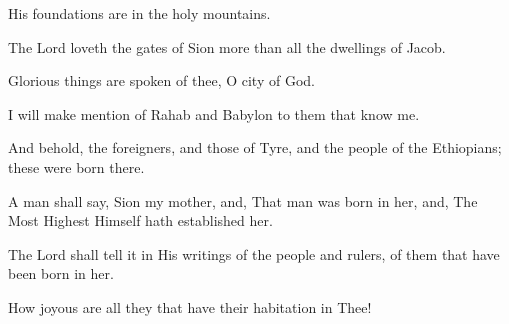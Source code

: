 His foundations are in the holy mountains.

The Lord loveth the gates of Sion more than all the dwellings of Jacob.

Glorious things are spoken of thee, O city of God.

I will make mention of Rahab and Babylon to them that know me.

And behold, the foreigners, and those of Tyre, and the people of the Ethiopians; these were born there.

A man shall say, Sion my mother, and, That man was born in her, and, The Most Highest Himself hath established her.

The Lord shall tell it in His writings of the people and rulers, of them that have been born in her.

How joyous are all they that have their habitation in Thee!
